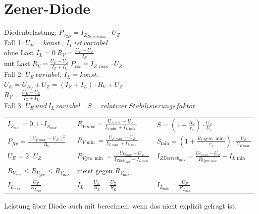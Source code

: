 \section{Zener-Diode}\label{sec:zener-diode}
    Diodenbelastung: $P_{v_{ZD}}=I_{Z_{Betrieb\max}}\cdot U_Z$\\
    Fall 1: $U_E=konst.,\, I_L\, ist\, variabel$\\
    \hspace*{1cm} ohne Last $I_L=0\: R_V=\frac{U_E-U_Z}{I_Z}$\\
    \hspace*{1cm} mit Last $R_V=\frac{U_E-U_Z}{I_Z+I_L}\: P_{tot}=I_{Z\, \max}\cdot U_Z$\\
    Fall 2: $U_E\, variabel,\, I_L=konst.$\\
    \hspace*{1cm} $U_E=U_{R_V}+U_Z=(I_Z+I_L)\cdot R_V+U_Z$\\
    \hspace*{1cm} $R_V=\frac{U_E-U_Z}{I_Z+I_L}$\\
    Fall 3: $U_E\, und\, I_L\, variabel\quad S=relativer\, Stabilisierungsfaktor$
    \begin{table}[H]
        \renewcommand{\arraystretch}{1.2}
        \begin{tabularx}{\columnwidth}{l l l}%
            $I_{Z_{\min}}=0,1\cdot I_{Z_{\max}}$            & $R_{Vmax}=\frac{U_{E\min}-U_Z}{I_{Z\min}+I_{L\max}}$
                & $S=(1+\frac{R_V}{r_z})\cdot\frac{U_Z}{U_e}$\\
            $P_{Rv}=\frac{(U_{E\max}-U_Z)^2}{R_V}$          & $R_{V\min}=\frac{U_{E\max}-U_Z}{I_{Z\max}+I_{L\min}}$
                & $S_{\min}=(1+\frac{R_V\,gew.\,\min}{r_z})\cdot\frac{U_Z}{U_{E\max}}$\\
            $U_E=2\cdot U_Z$                                & $R_{Vgew\min}=\frac{U{e_{\max}}-U_Z}{I_{ZBetr_{\max}}+I_{L\min}}$
                & $I_{Z{Betrieb_{\max}}}=\frac{U{e_{\max}}-U_Z}{R_{Vgew\min}}-I_{L\min}$\\
            $R_{V_{\min}}\leq R_{V_{gew}} \leq R_{V_{\max}}$& meist gegen $R_{V_{\max}}$
                & \\
            $I_{L_{\max}}=\frac{U_Z}{R_{L_{\min}}}$         & $I_L=\frac{U_A}{R_L}=\frac{U_Z}{R_L}$
                & $I_{L_{\min}}=\frac{U_Z}{R_{L_{\max}}}$ \\
        \end{tabularx}
    \end{table}
    Leistung über Diode auch mit berechnen, wenn das nicht explizit gefragt ist.\\
    

